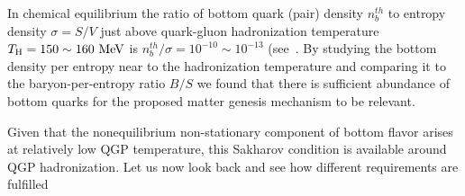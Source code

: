 In chemical equilibrium the ratio of bottom quark (pair) density $n_b^{th}$ to entropy density $\sigma=S/V$ just above quark-gluon hadronization temperature $T_\mathrm{H}=150\sim160\text{ MeV}$ is $n_b^{th}/\sigma=10^{-10}\sim 10^{-13}$ (see~. By studying the bottom density per entropy near to the hadronization temperature and comparing it to the baryon-per-entropy ratio $B/S$ we found that there is sufficient abundance of bottom quarks for the proposed matter genesis mechanism to be relevant.

Given that the nonequilibrium non-stationary component of bottom flavor arises at relatively low QGP temperature, this Sakharov condition is available around QGP hadronization. Let us now look back and see how different requirements are fulfilled
